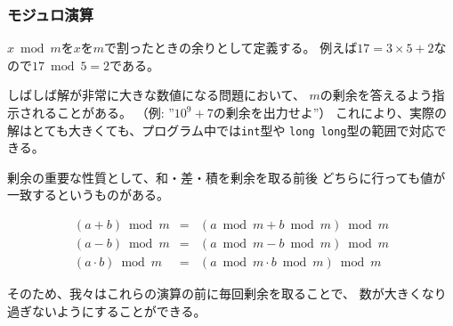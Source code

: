 \subsubsection{モジュロ演算}


\begin{comment}
We denote by $x \bmod m$ the remainder
when $x$ is divided by $m$.
For example, $17 \bmod 5 = 2$,
because $17 = 3 \cdot 5 + 2$.

Sometimes, the answer to a problem is a
very large number but it is enough to
output it ''modulo $m$'', i.e.,
the remainder when the answer is divided by $m$
(for example, ''modulo $10^9+7$'').
The idea is that even if the actual answer
is very large,
it suffices to use the types
\texttt{int} and \texttt{long long}.
\end{comment}

$x \bmod m$を$x$を$m$で割ったときの余りとして定義する。
例えば$17 = 3 \times 5 + 2$なので$17 \bmod 5 = 2$である。

しばしば解が非常に大きな数値になる問題において、
$m$の剰余を答えるよう指示されることがある。
（例: ''$10^9+7$の剰余を出力せよ''）
これにより、実際の解はとても大きくても、プログラム中では\texttt{int}型や
\texttt{long long}型の範囲で対応できる。

\begin{comment}
An important property of the remainder is that
in addition, subtraction and multiplication,
the remainder can be taken before the operation:
\end{comment}

剰余の重要な性質として、和・差・積を剰余を取る前後
どちらに行っても値が一致するというものがある。

\[
\begin{array}{rcr}
(a+b) \bmod m & = & (a \bmod m + b \bmod m) \bmod m \\
(a-b) \bmod m & = & (a \bmod m - b \bmod m) \bmod m \\
(a \cdot b) \bmod m & = & (a \bmod m \cdot b \bmod m) \bmod m
\end{array}
\]

\begin{comment}
Thus, we can take the remainder after every operation
and the numbers will never become too large.

For example, the following code calculates $n!$,
the factorial of $n$, modulo $m$:
\end{comment}

そのため、我々はこれらの演算の前に毎回剰余を取ることで、
数が大きくなり過ぎないようにすることができる。

